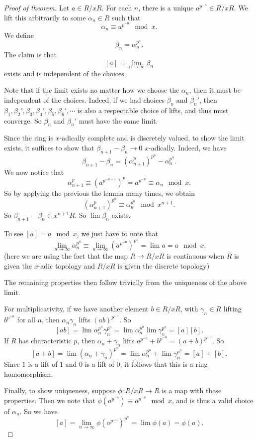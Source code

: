 \documentclass[a4paper]{article}
\begin{document}
\begin{proof}[Proof of theorem]
  Let $a \in R/xR$. For each $n$, there is a unique $a^{p^{-n}} \in R/xR$. We lift this arbitrarily to some $\alpha_n \in R$ such that
  \[
    \alpha_n \equiv a^{p^{-n}} \mod x.
  \]
  We define
  \[
    \beta_n = \alpha_n^{p^n}.
  \]
  The claim is that
  \[
    [a] = \lim_{n \to \infty}\beta_n
  \]
  exists and is independent of the choices.

  Note that if the limit exists no matter how we choose the $\alpha_n$, then it must be independent of the choices. Indeed, if we had choices $\beta_n$ and $\beta_n'$, then $\beta_1, \beta_2', \beta_3, \beta_4', \beta_5, \beta_6', \cdots$ is also a respectable choice of lifts, and thus must converge. So $\beta_n$ and $\beta_n'$ must have the same limit.

  Since the ring is $x$-adically complete and is discretely valued, to show the limit exists, it suffices to show that $\beta_{n + 1} - \beta_n \to 0$ $x$-adically. Indeed, we have
  \[
    \beta_{n + 1} - \beta_n = (\alpha_{n + 1}^p)^{p^n} - \alpha_n^{p^n}.
  \]
  We now notice that
  \[
    \alpha_{n + 1}^p \equiv (a^{p^{-n - 1}})^p = a^{p^{-n}} \equiv \alpha_n \mod x.
  \]
  So by applying the previous the lemma many times, we obtain
  \[
    (\alpha_{n + 1}^p)^{p^n} \equiv \alpha_n^{p^n} \mod x^{n + 1}.
  \]
  So $\beta_{n + 1} - \beta_n \in x^{n + 1} R$. So $\lim \beta_n$ exists.

  To see $[a] = a\mod x$, we just have to note that
  \[
    \lim_{n \to \infty} \alpha_n^{p^n} \equiv \lim_{n \to \infty} (a^{p^{-n}})^{p^n} = \lim a = a \mod x.
  \]
  (here we are using the fact that the map $R \to R/xR$ is continuous when $R$ is given the $x$-adic topology and $R/xR$ is given the discrete topology)

  The remaining properties then follow trivially from the uniqueness of the above limit.

  For multiplicativity, if we have another element $b \in R/xR$, with $\gamma_n \in R$ lifting $b^{p^{-n}}$ for all $n$, then $\alpha_n \gamma_n$ lifts $(ab)^{p^{-n}}$. So
  \[
    [ab] = \lim\alpha_n^{p^n} \gamma_n^{p^n} = \lim \alpha_n^{p^n} \lim \gamma_n^{p^n} = [a][b].
  \]
  If $R$ has characteristic $p$, then $\alpha_n + \gamma_n$ lifts $a^{p^{-n}} + b^{p^{-n}} = (a + b)^{p^{-n}}$. So
  \[
    [a + b] = \lim (\alpha_n + \gamma_n)^{p^n} = \lim \alpha_n^{p^n} + \lim \gamma_n^{p^n} = [a] + [b].
  \]
  Since $1$ is a lift of $1$ and $0$ is a lift of $0$, it follows that this is a ring homomorphism.

  Finally, to show uniqueness, suppose $\phi: R/xR \to R$ is a map with these properties. Then we note that $\phi(a^{p^{-n}}) \equiv a^{p^{-n}} \mod x$, and is thus a valid choice of $\alpha_n$. So we have
  \[
    [a] = \lim_{n \to \infty} \phi(a^{p^{-n}})^{p^n} = \lim \phi(a) = \phi(a).
  \]
\end{proof}
\end{document}
